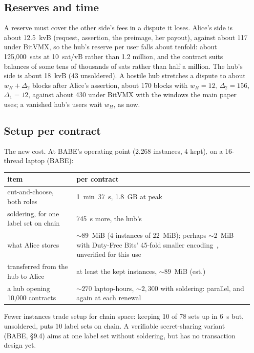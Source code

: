 \documentclass[11pt]{article}
\begin{document}
\subsection{Reserves and time}

A reserve must cover the other side's fees in a dispute it loses. Alice's
side is about 12.5~kvB (request, assertion, the preimage, her payout),
against about 117 under BitVMX, so the hub's reserve per user falls
about tenfold: about 125,000~sats at 10~sat/vB rather than 1.2 million,
and the contract suits balances of some tens of thousands of sats
rather than half a million. The hub's side is about 18~kvB (43
unsoldered). A hostile hub stretches a dispute to about
$w_H + \Delta_2$ blocks after Alice's assertion, about 170 blocks with
$w_H = 12$, $\Delta_2 = 156$, $\Delta_1 = 12$, against about 430 under
BitVMX with the windows the main paper uses; a vanished hub's users wait
$w_H$, as now.

\subsection{Setup per contract}
\label{sec:setup}

The new cost. At BABE's operating point (2,268 instances, 4 kept), on a
16-thread laptop (BABE):
\begin{center}
\small
\begin{tabularx}{\linewidth}{>{\raggedright\arraybackslash}p{60mm}L}
\toprule
item & per contract \\
\midrule
cut-and-choose, both roles & 1~min~37~s, 1.8~GB at peak \\
soldering, for one label set on chain & 745~s more, the hub's \\
what Alice stores & ${\sim}89$~MiB (4 instances of 22~MiB); perhaps ${\sim}2$~MiB with Duty-Free Bits' 45-fold smaller encoding~\cite{dutyfree}, unverified for this use \\
transferred from the hub to Alice & at least the kept instances, ${\sim}89$~MiB (est.) \\
a hub opening 10,000 contracts & ${\sim}270$ laptop-hours, ${\sim}2{,}300$ with soldering: parallel, and again at each renewal \\
\bottomrule
\end{tabularx}
\end{center}
Fewer instances trade setup for chain space: keeping 10 of 78 sets up in
6~s but, unsoldered, puts 10 label sets on chain. A verifiable
secret-sharing variant (BABE, §9.4) aims at one label set without
soldering, but has no transaction design yet.
\end{document}
